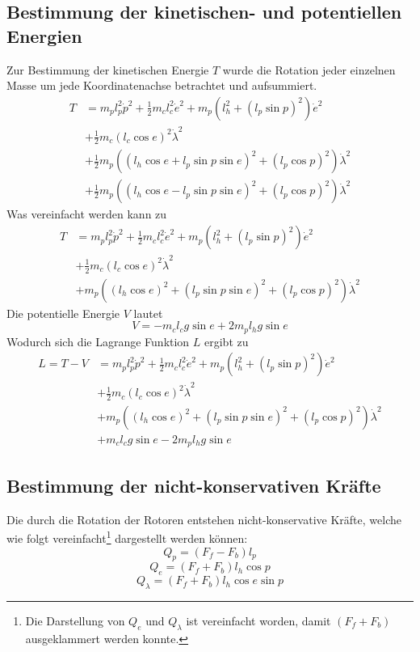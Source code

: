 \documentclass{article}
\begin{document}
\subsection{Bestimmung der kinetischen- und potentiellen Energien}
Zur Bestimmung der kinetischen Energie $T$ wurde die Rotation jeder einzelnen Masse um jede Koordinatenachse betrachtet und aufsummiert.
\begin{equation}
\begin{split}
T&= m_p l_p^2\dot{p}^2 + \frac{1}{2}m_cl_c^2\dot{e}^2 
+ m_p(l_h^2+(l_p\sin p)^2)\dot{e}^2\\
&+ \frac{1}{2} m_c (l_c \cos e)^2\dot{\lambda}^2\\
&+ \frac{1}{2} m_p((l_h \cos e +l_p \sin p \sin e)^2+(l_p \cos p)^2)\dot{\lambda}^2\\
&+ \frac{1}{2} m_p((l_h \cos e -l_p \sin p \sin e)^2+(l_p \cos p)^2)\dot{\lambda}^2
\end{split}
\end{equation}
Was vereinfacht werden kann zu
\begin{equation}
\begin{split}
T&= m_p l_p^2\dot{p}^2 + \frac{1}{2}m_cl_c^2\dot{e}^2 
+ m_p(l_h^2+(l_p\sin p)^2)\dot{e}^2\\
&+ \frac{1}{2} m_c (l_c \cos e)^2\dot{\lambda}^2\\
&+ m_p((l_h \cos e)^2 + (l_p \sin p \sin e)^2+(l_p \cos p)^2)\dot{\lambda}^2
\end{split}
\end{equation}
Die potentielle Energie $V$ lautet
\begin{equation}
V = -m_c l_c g \sin e + 2 m_p l_h g \sin e
\end{equation}
Wodurch sich die Lagrange Funktion $L$ ergibt zu 
\begin{equation}
\begin{split}
L = T - V&= m_p l_p^2\dot{p}^2 + \frac{1}{2}m_cl_c^2\dot{e}^2 
+ m_p(l_h^2+(l_p\sin p)^2)\dot{e}^2\\
&+ \frac{1}{2} m_c (l_c \cos e)^2\dot{\lambda}^2\\
&+ m_p((l_h \cos e)^2 + (l_p \sin p \sin e)^2+(l_p \cos p)^2)\dot{\lambda}^2\\
&+ m_c l_c g \sin e - 2 m_p l_h g \sin e
\end{split}
\end{equation}
\subsection{Bestimmung der nicht-konservativen Kräfte}
Die durch die Rotation der Rotoren entstehen nicht-konservative Kräfte, welche wie folgt vereinfacht\footnote{Die Darstellung von $Q_e$ und $Q_\lambda$ ist vereinfacht worden, damit $(F_f + F_b)$ ausgeklammert werden konnte.} dargestellt werden können:
\begin{equation}
Q_p = (F_f - F_b)l_p
\end{equation}
\begin{equation}
Q_e = (F_f + F_b)l_h  \cos p
\end{equation}
\begin{equation}
Q_\lambda = (F_f + F_b)l_h \cos e \sin p
\end{equation}
\end{document}

